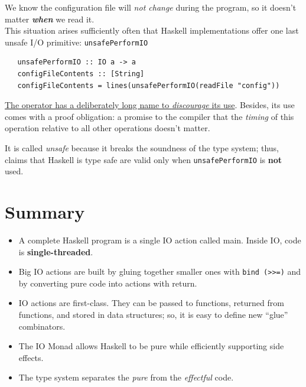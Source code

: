 We know the configuration file will \textit{not change}
during the program, so it doesn’t matter \textit{\textbf{when}} we
read it.\\
This situation arises sufficiently often that Haskell
implementations offer one last unsafe I/O primitive:
\lstinline|unsafePerformIO|
\begin{lstlisting}
   unsafePerformIO :: IO a -> a
   configFileContents :: [String]
   configFileContents = lines(unsafePerformIO(readFile "config"))
\end{lstlisting}

\ul{The operator has a deliberately long name to
\textit{discourage} its use}.
Besides, its use comes with a proof obligation:
a promise to the compiler that the \textit{timing} of this operation
relative to all other operations doesn’t matter.

It is called \textit{unsafe} because it breaks the soundness of the type system;
thus, claims that Haskell is type safe are valid only when \lstinline|unsafePerformIO| is \textbf{not} used.

\section{Summary}
\begin{itemize}
   \item A complete Haskell program is a single IO action called
   main. Inside IO, code is \textbf{single-threaded}.
   \item Big IO actions are built by gluing together smaller ones with
   \lstinline|bind (>>=)| and by converting pure code into actions with
   return.
   \item IO actions are first-class.
   They can be passed to functions, returned from functions, and
   stored in data structures; so, it is easy to define new ``glue'' combinators.
   \item The IO Monad allows Haskell to be pure while efficiently
   supporting side effects.
   \item The type system separates the \textit{pure} from the \textit{effectful} code.
\end{itemize}

